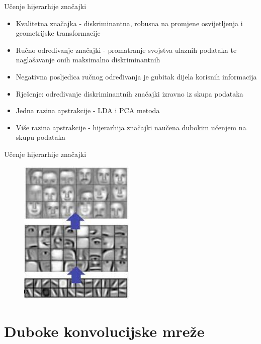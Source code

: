 \documentclass[pdf]{beamer}
\begin{document}
\begin{frame}{Učenje hijerarhije značajki}

\begin{itemize}
\setlength\itemsep{0.5em}

	\item Kvalitetna značajka - diskriminantna, robusna na promjene osvijetljenja i geometrijske transformacije
	
	\item Ručno određivanje značajki - promatranje svojstva ulaznih podataka te naglašavanje onih maksimalno diskriminantnih
	
	\item Negativna posljedica ručnog određivanja je gubitak dijela korisnih informacija
	
	\item Rješenje: određivanje diskriminantnih značajki izravno iz skupa podataka

	\item Jedna razina apstrakcije - LDA i PCA metoda
	
	\item Više razina apstrakcije - hijerarhija značajki naučena dubokim učenjem na skupu podataka
		
\end{itemize}

\end{frame}

\begin{frame}{Učenje hijerarhije značajki}

\begin{figure}[ht!]
\centering
\includegraphics[height=7cm]{slike/feature_hierarchy.png}
\end{figure}

\end{frame}


\section{Duboke konvolucijske mreže}
\end{document}
